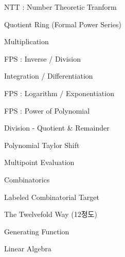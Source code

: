 \documentclass[portrait, 8pt, a4paper, oneside, twocolumn]{extarticle}
\begin{document}
\begin{tcolorbox}[breakable, enhanced, sharp corners, colback=white, colframe=black, boxrule=1pt, left=0pt]
\begin{IdeaNote}
\begin{IdeaNote}
\begin{IdeaNote}
        \item NTT : Number Theoretic Tranform
        \item Quotient Ring (Formal Power Series)
            \begin{IdeaNote}
            \item Multiplication
            \item FPS : Inverse / Division
            \item Integration / Differentiation
            \item FPS : Logarithm / Exponentiation
            \item FPS : Power of Polynomial
            \item Division - Quotient \& Remainder
            \item Polynomial Taylor Shift
            \item Multipoint Evaluation
            \end{IdeaNote}
        \end{IdeaNote}
    \item Combinatorics
        \begin{IdeaNote}
        \item Labeled Combinatorial Target
        \item The Twelvefold Way (12정도)
        \item Generating Function
        \end{IdeaNote}
    \end{IdeaNote}
\item Linear Algebra


\end{IdeaNote}
\end{tcolorbox}
\end{document}
